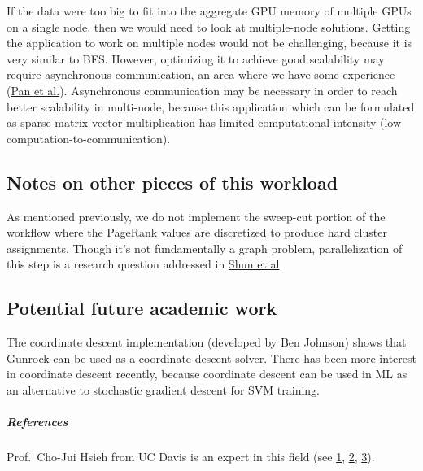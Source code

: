 \documentclass[10pt,oneside]{memoir}
\let\oldsubparagraph\subparagraph
\renewcommand{\subparagraph}[1]{\oldsubparagraph{#1}\mbox{}}
\begin{document}
If the data were too big to fit into the aggregate GPU memory of
multiple GPUs on a single node, then we would need to look at
multiple-node solutions. Getting the application to work on multiple
nodes would not be challenging, because it is very similar to BFS.
However, optimizing it to achieve good scalability may require
asynchronous communication, an area where we have some experience
(\href{https://arxiv.org/pdf/1803.03922.pdf}{Pan et al.}). Asynchronous
communication may be necessary in order to reach better scalability in
multi-node, because this application which can be formulated as
sparse-matrix vector multiplication has limited computational intensity
(low computation-to-communication).

\hypertarget{notes-on-other-pieces-of-this-workload-5}{%
\subsection{Notes on other pieces of this
workload}\label{notes-on-other-pieces-of-this-workload-5}}

As mentioned previously, we do not implement the sweep-cut portion of
the workflow where the PageRank values are discretized to produce hard
cluster assignments. Though it's not fundamentally a graph problem,
parallelization of this step is a research question addressed in
\href{https://arxiv.org/abs/1604.07515}{Shun et al}.

\hypertarget{potential-future-academic-work}{%
\subsection{Potential future academic
work}\label{potential-future-academic-work}}

The coordinate descent implementation (developed by Ben Johnson) shows
that Gunrock can be used as a coordinate descent solver. There has been
more interest in coordinate descent recently, because coordinate descent
can be used in ML as an alternative to stochastic gradient descent for
SVM training.

\hypertarget{references}{%
\subparagraph{References}\label{references}}

Prof.~Cho-Jui Hsieh from UC Davis is an expert in this field (see
\href{http://www.jmlr.org/proceedings/papers/v37/hsieha15-supp.pdf}{1},
\href{https://www.semanticscholar.org/paper/HogWild\%2B\%2B\%3A-A-New-Mechanism-for-Decentralized-Zhang-Hsieh/183d421bfb807378bd0463894415f40e0fca64d6}{2},
\href{http://www.stat.ucdavis.edu/~chohsieh/passcode_fix.pdf}{3}).
\end{document}
